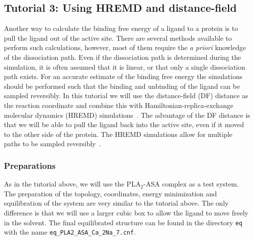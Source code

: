 
\subsection{Tutorial 3: Using HREMD and distance-field}
Another way to calculate the binding free energy of a ligand to a protein is to pull the ligand out of the active site. 
There are several methods available to perform such calculations, however, most of them require the \textit{a priori} knowledge of the dissociation path. 
Even if the dissociation path is determined during the simulation, it is often assumed that it is linear, or that only a single dissociation path exists. 
For an accurate estimate of the binding free energy the simulations should be performed such that the binding and unbinding of the ligand can be sampled reversibly.
In this tutorial we will use the distance-field (DF) distance as the reaction coordinate and combine this with Hamiltonian-replica-exchange molecular dynamics (HREMD) simulations~\cite{deRuiter_2013}.
The advantage of the DF distance is that we will be able to pull the ligand back into the active site, even if it moved to the other side of the protein. 
The HREMD simulations allow for multiple paths to be sampled reversibly~\cite{Nagy_2017}.

\subsubsection{Preparations}
As in the tutorial above, we will use the PLA$_2$-ASA complex as a test system. 
The preparation of the topology, coordinates, energy minimization and equilibration of the system are very similar to the tutorial above. 
The only difference is that we will use a larger cubic box to allow the ligand to move freely in the solvent. 
The final equilibrated structure can be found in the directory \texttt{eq} with the name \texttt{eq\_PLA2\_ASA\_Ca\_2Na\_7.cnf}.

